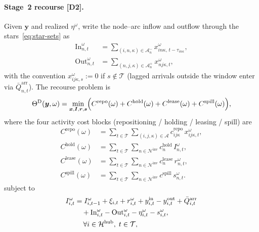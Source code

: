 \documentclass[a4paper,fleqn]{cas-sc}
\begin{document}
\paragraph{Stage~2 recourse [D2].}
Given $\boldsymbol{y}$ and realized $\eta^{\omega}$, write the node--arc
inflow and outflow through the stars~\eqref{eq:star-sets} as
\begin{equation}
\begin{aligned}
\mathrm{In}_{n,t}^{\omega}
&=\sum_{(i,n,\kappa)\in\mathcal{A}_n^{-}}
  x_{in\kappa,\,t-\tau_{in\kappa}}^{\omega},
\\
\mathrm{Out}_{n,t}^{\omega}
&=\sum_{(n,j,\kappa)\in\mathcal{A}_n^{+}}
  x_{nj\kappa,t}^{\omega},
\end{aligned}
\label{eq:d2-inout}
\end{equation}
with the convention $x_{ij\kappa,s}^{\omega}:=0$ if $s\notin\mathcal{T}$
(lagged arrivals outside the window enter via $\bar{Q}_{n,t}^{\mathrm{arr}}$).
The recourse problem is
\begin{equation}
\Theta^{\mathrm{D}}(\boldsymbol{y},\omega)
=\min_{\boldsymbol{x},\boldsymbol{I},\boldsymbol{r},\boldsymbol{s}}
\Bigl(
C^{\mathrm{repo}}(\omega)
+C^{\mathrm{hold}}(\omega)
+C^{\mathrm{lease}}(\omega)
+C^{\mathrm{spill}}(\omega)
\Bigr),
\label{eq:d2-obj}
\end{equation}
where the four activity cost blocks (repositioning / holding / leasing / spill)
are
\begin{align}
C^{\mathrm{repo}}(\omega)
&=\sum_{t\in\mathcal{T}}
  \sum_{(i,j,\kappa)\in\mathcal{A}}
  c_{ij\kappa}^{\mathrm{repo}}\,x_{ij\kappa,t}^{\omega},
\label{eq:d2-cost-repo}\\
C^{\mathrm{hold}}(\omega)
&=\sum_{t\in\mathcal{T}}
  \sum_{n\in\mathcal{N}^{\mathrm{inv}}}
  c_n^{\mathrm{hold}}\,I_{n,t}^{\omega},
\label{eq:d2-cost-hold}\\
C^{\mathrm{lease}}(\omega)
&=\sum_{t\in\mathcal{T}}
  \sum_{n\in\mathcal{N}^{\mathrm{inv}}}
  c_n^{\mathrm{lease}}\,r_{n,t}^{\omega},
\label{eq:d2-cost-lease}\\
C^{\mathrm{spill}}(\omega)
&=\sum_{t\in\mathcal{T}}
  \sum_{n\in\mathcal{N}^{\mathrm{inv}}}
  c^{\mathrm{spill}}\,s_{n,t}^{\omega}.
\label{eq:d2-cost-spill}
\end{align}
subject to
\begin{equation}
\begin{aligned}
I_{i,t}^{\omega}
&=I_{i,t-1}^{\omega}+\xi_{i,t}+r_{i,t}^{\omega}
 +y_{i,t}^{\mathrm{in}}-y_{i,t}^{\mathrm{out}}
 +\bar{Q}_{i,t}^{\mathrm{arr}}
\\
&\quad{}
 +\mathrm{In}_{i,t}^{\omega}-\mathrm{Out}_{i,t}^{\omega}
 -\eta_{i,t}^{\omega}-s_{i,t}^{\omega},
\\
&\hspace{1.2em}
\forall i\in\mathcal{H}^{\mathrm{hub}},\; t\in\mathcal{T},
\end{aligned}
\label{eq:d2-hub}
\end{equation}
\end{document}
